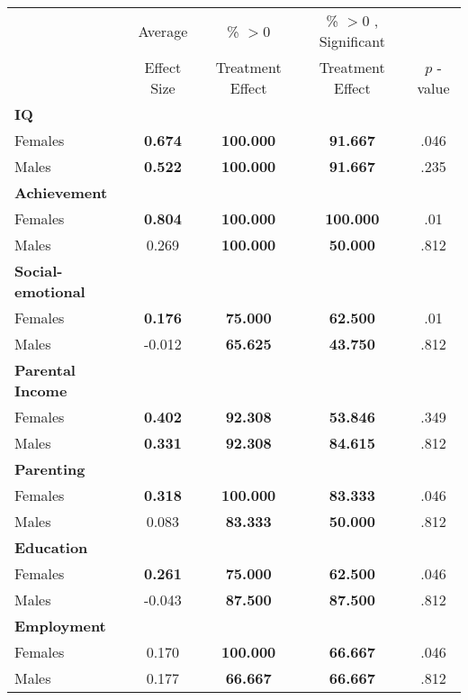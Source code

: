 \begin{tabular}{l c c c c}
\toprule
 & Average & \% $ >0 $ & \% $ >0 $ , Significant & \citet{Rosenbaum_2005_Distribution_JRSS} \\
 & Effect Size & Treatment Effect & Treatment Effect & $ p $ -value \\
\midrule
\textbf{IQ} & & & & \\
\quad Females &  \textbf{    0.674} & \textbf{  100.000} & \textbf{   91.667} & .046 \\
\quad Males &  \textbf{    0.522} & \textbf{  100.000} & \textbf{   91.667} & .235 \\
\midrule
\textbf{Achievement} & & & & \\
\quad Females &  \textbf{    0.804} & \textbf{  100.000} & \textbf{  100.000} & .01 \\
\quad Males &      0.269 & \textbf{  100.000} & \textbf{   50.000} & .812 \\
\midrule
\textbf{Social-emotional} & & & & \\
\quad Females &  \textbf{    0.176} & \textbf{   75.000} & \textbf{   62.500} & .01 \\
\quad Males &     -0.012 & \textbf{   65.625} & \textbf{   43.750} & .812 \\
\midrule
\textbf{Parental Income} & & & & \\
\quad Females &  \textbf{    0.402} & \textbf{   92.308} & \textbf{   53.846} & .349 \\
\quad Males &  \textbf{    0.331} & \textbf{   92.308} & \textbf{   84.615} & .812 \\
\midrule
\textbf{Parenting} & & & & \\
\quad Females &  \textbf{    0.318} & \textbf{  100.000} & \textbf{   83.333} & .046 \\
\quad Males &      0.083 & \textbf{   83.333} & \textbf{   50.000} & .812 \\
\midrule
\textbf{Education} & & & & \\
\quad Females &  \textbf{    0.261} & \textbf{   75.000} & \textbf{   62.500} & .046 \\
\quad Males &     -0.043 & \textbf{   87.500} & \textbf{   87.500} & .812 \\
\midrule
\textbf{Employment} & & & & \\
\quad Females &      0.170 & \textbf{  100.000} & \textbf{   66.667} & .046 \\
\quad Males &      0.177 & \textbf{   66.667} & \textbf{   66.667} & .812 \\

\end{tabular}
